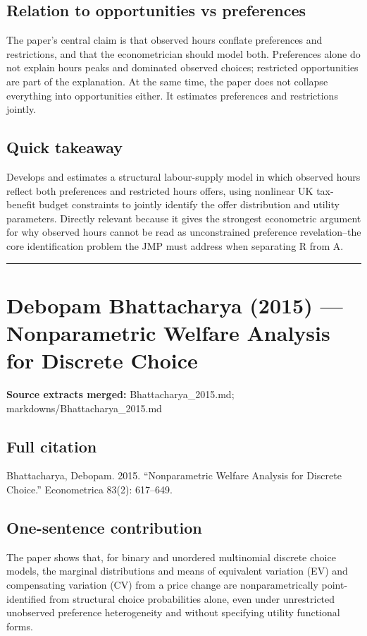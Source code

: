 \documentclass[11pt,a4paper]{article}
\begin{document}
\subsection*{Relation to opportunities vs preferences}
The paper’s central claim is that observed hours conflate preferences and restrictions, and that the econometrician should model both. Preferences alone do not explain hours peaks and dominated observed choices; restricted opportunities are part of the explanation. At the same time, the paper does not collapse everything into opportunities either. It estimates preferences and restrictions jointly.

\subsection*{Quick takeaway}
Develops and estimates a structural labour-supply model in which observed hours reflect both preferences and restricted hours offers, using nonlinear UK tax-benefit budget constraints to jointly identify the offer distribution and utility parameters. Directly relevant because it gives the strongest econometric argument for why observed hours cannot be read as unconstrained preference revelation--the core identification problem the JMP must address when separating R from A.


\medskip\hrule\medskip

\section*{Debopam Bhattacharya (2015) — Nonparametric Welfare Analysis for Discrete Choice}

\textbf{Source extracts merged:} Bhattacharya\_2015.md; markdowns/Bhattacharya\_2015.md

\subsection*{Full citation}
Bhattacharya, Debopam. 2015. “Nonparametric Welfare Analysis for Discrete Choice.” Econometrica 83(2): 617–649.

\subsection*{One-sentence contribution}
The paper shows that, for binary and unordered multinomial discrete choice models, the marginal distributions and means of equivalent variation (EV) and compensating variation (CV) from a price change are nonparametrically point-identified from structural choice probabilities alone, even under unrestricted unobserved preference heterogeneity and without specifying utility functional forms.
\end{document}
